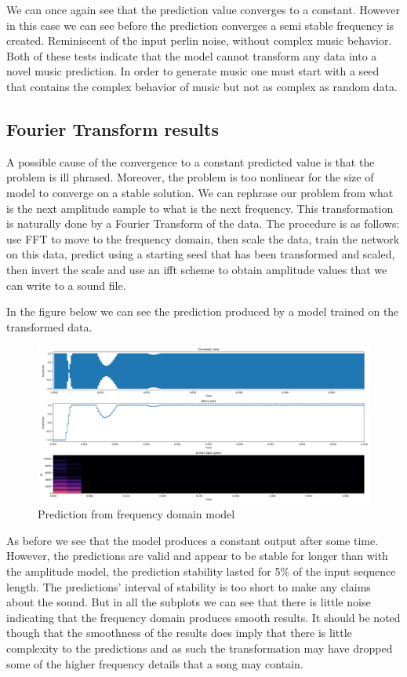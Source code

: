 \documentclass{article}
\begin{document}
We can once again see that the prediction value converges to a constant. However in this case we can see before the prediction converges a semi stable frequency is created. Reminiscent of the input perlin noise, without complex music behavior. Both of these tests indicate that the model cannot transform any data into a novel music prediction. In order to generate music one must start with a seed that contains the complex behavior of music but not as complex as random data. 
\subsection{Fourier Transform results}
A possible cause of the convergence to a constant predicted value is that the problem is ill phrased. Moreover, the problem is too nonlinear for the size of model to converge on a stable solution. We can rephrase our problem from what is the next amplitude sample to what is the next frequency. This transformation is naturally done by a Fourier Transform of the data. The procedure is as follows: use FFT to move to the frequency domain, then scale the data, train the network on this data, predict using a starting seed that has been transformed and scaled, then invert the scale and use an ifft scheme to obtain amplitude values that we can write to a sound file. 

In the figure below we can see the prediction produced by a model trained on the transformed data. 
\begin{figure}[H]
\caption{Prediction from frequency domain model}
\includegraphics[scale=0.35]{fs_prediction.png}
\end{figure}
As before we see that the model produces a constant output after some time. However, the predictions are valid and appear to be stable for longer than with the amplitude model, the prediction stability lasted for 5\% of the input sequence length. The predictions' interval of stability is too short to make any claims about the sound. But in all the subplots we can see that there is little noise indicating that the frequency domain produces smooth results. It should be noted though that the smoothness of the results does imply that there is little complexity to the predictions and as such the transformation may have dropped some of the higher frequency details that a song may contain.  
\end{document}
